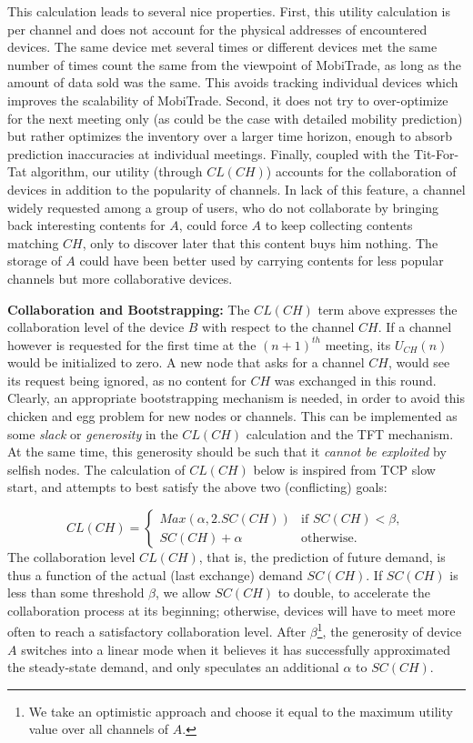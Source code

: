 This calculation leads to several nice properties. First, this utility calculation is per channel and does not account for the physical addresses of encountered devices. The same device met several times or different devices met the same number of times count the same from the viewpoint of MobiTrade, as long as the amount of data sold was the same. This avoids tracking individual devices which improves the scalability of MobiTrade. Second, it does not try to over-optimize for the next meeting only (as could be the case with detailed mobility prediction) but rather optimizes the inventory over a larger time horizon, enough to absorb prediction inaccuracies at individual meetings. Finally, coupled with the Tit-For-Tat algorithm, our utility (through $CL(CH)$) accounts for the collaboration of devices in addition to the popularity of channels. In lack of this feature, a channel widely requested among a group of users, who do not collaborate by bringing back interesting contents for $A$, could force $A$ to keep collecting contents matching $CH$, only to discover later that this content buys him nothing. The storage of $A$ could have been better used by carrying contents for less popular channels but more collaborative devices.

\noindent \textbf{Collaboration and Bootstrapping:}
The $CL(CH)$ term above expresses the collaboration level of the device $B$ with respect to the channel $CH$. If a channel however is requested for the first time at the $(n+1)^{th}$ meeting, its $U_{CH}(n)$ would be initialized to zero. A new node that asks for a channel $CH$, would see its request being ignored, as no content for $CH$ was exchanged in this round. Clearly, an appropriate bootstrapping mechanism is needed, in order to avoid this chicken and egg problem for new nodes or channels. This can be implemented as some \emph{slack} or \emph{generosity} in the $CL(CH)$ calculation and the TFT mechanism. At the same time, this generosity should be such that it \emph{cannot be exploited} by selfish nodes. The calculation of $CL(CH)$ below is inspired from TCP slow start, and attempts to best satisfy the above two (conflicting) goals:

$$
CL(CH) = \left\{
    \begin{array}{ll}
        Max(\alpha, 2 . SC(CH)) & \mbox{if } SC(CH) < \beta, \\
        SC(CH) + \alpha & \mbox{otherwise.}
    \end{array}
\right.
$$
The collaboration level $CL(CH)$, that is, the prediction of future demand, is thus a function of the actual (last exchange) demand $SC(CH)$. If $SC(CH)$ is less than some threshold $\beta$, we allow $SC(CH)$ to double, to accelerate the collaboration process at its beginning; otherwise, devices will have to meet more often to reach a satisfactory collaboration level. After $\beta$\footnote{We take an optimistic approach and choose it equal to the maximum utility value over all channels of $A$.}, the generosity of device $A$ switches into a linear mode when it believes it has successfully approximated the steady-state demand, and only speculates an additional $\alpha$ to $SC(CH)$.

